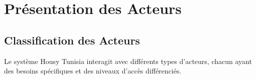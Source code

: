 
\section{Présentation des Acteurs}

\subsection{Classification des Acteurs}

Le système Housy Tunisia interagit avec différents types d'acteurs, chacun ayant des besoins spécifiques et des niveaux d'accès différenciés.

